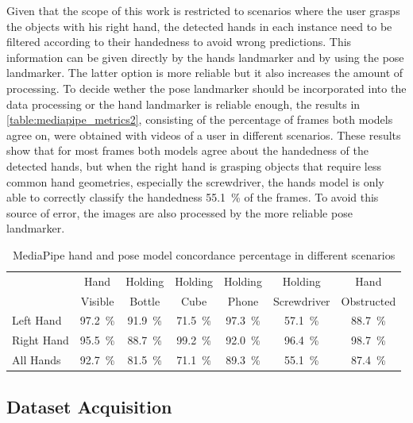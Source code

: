 Given that the scope of this work is restricted to scenarios where the user grasps the objects with his right hand, the detected hands in each instance need to be filtered according to their handedness to avoid wrong predictions. This information can be given directly by the hands landmarker and by using the pose landmarker. The latter option is more reliable but it also increases the amount of processing. To decide wether the pose landmarker should be incorporated into the data processing or the hand landmarker is reliable enough, the results in \autoref{table:mediapipe_metrics2}, consisting of the percentage of frames both models agree on, were obtained with videos of a user in different scenarios. These results show that for most frames both models agree about the handedness of the detected hands, but when the right hand is grasping objects that require less common hand geometries, especially the screwdriver, the hands model is only able to correctly classify the handedness \SI{55.1}{\percent} of the frames. To avoid this source of error, the images are also processed by the more reliable pose landmarker.

\begin{table}[ht]
    \centering
    \caption{MediaPipe hand and pose model concordance percentage in different scenarios}
    \label{table:mediapipe_metrics2}
    \begin{tabular}{lcccccc}
        \toprule
        & Hand\multirow{2}{*}{} & Holding\multirow{2}{*}{} & Holding\multirow{2}{*}{} & Holding\multirow{2}{*}{} & Holding\multirow{2}{*}{} & Hand\multirow{2}{*}{} \\
        & Visible & Bottle & Cube & Phone & Screwdriver & Obstructed \\
        \midrule
        Left Hand & \SI{97.2}{\percent} & \SI{91.9}{\percent} & \SI{71.5}{\percent} & \SI{97.3}{\percent} & \SI{57.1}{\percent} & \SI{88.7}{\percent} \\
        Right Hand & \SI{95.5}{\percent} & \SI{88.7}{\percent} & \SI{99.2}{\percent} & \SI{92.0}{\percent} & \SI{96.4}{\percent} & \SI{98.7}{\percent} \\
        All Hands & \SI{92.7}{\percent} & \SI{81.5}{\percent} & \SI{71.1}{\percent} & \SI{89.3}{\percent} & \SI{55.1}{\percent} & \SI{87.4}{\percent} \\
        \bottomrule
    \end{tabular}
\end{table}

\subsection{Dataset Acquisition}

